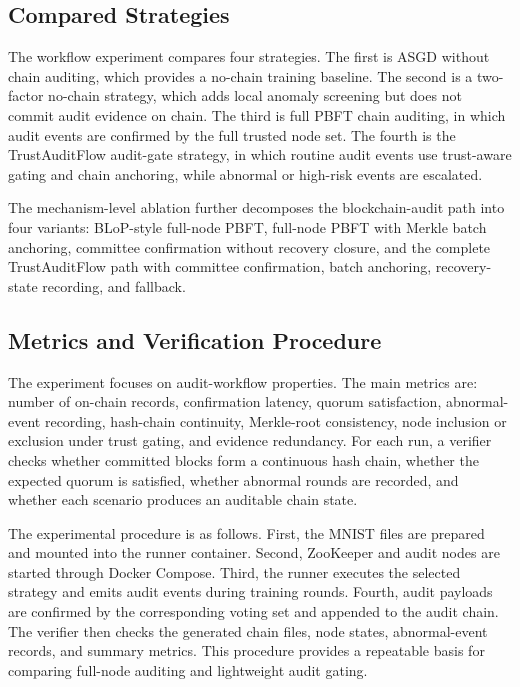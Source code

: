 \subsection{Compared Strategies}

The workflow experiment compares four strategies. The first is ASGD without chain auditing, which provides a no-chain training baseline. The second is a two-factor no-chain strategy, which adds local anomaly screening but does not commit audit evidence on chain. The third is full PBFT chain auditing, in which audit events are confirmed by the full trusted node set. The fourth is the TrustAuditFlow audit-gate strategy, in which routine audit events use trust-aware gating and chain anchoring, while abnormal or high-risk events are escalated.

The mechanism-level ablation further decomposes the blockchain-audit path into four variants: BLoP-style full-node PBFT, full-node PBFT with Merkle batch anchoring, committee confirmation without recovery closure, and the complete TrustAuditFlow path with committee confirmation, batch anchoring, recovery-state recording, and fallback.

\subsection{Metrics and Verification Procedure}

The experiment focuses on audit-workflow properties. The main metrics are: number of on-chain records, confirmation latency, quorum satisfaction, abnormal-event recording, hash-chain continuity, Merkle-root consistency, node inclusion or exclusion under trust gating, and evidence redundancy. For each run, a verifier checks whether committed blocks form a continuous hash chain, whether the expected quorum is satisfied, whether abnormal rounds are recorded, and whether each scenario produces an auditable chain state.

The experimental procedure is as follows. First, the MNIST files are prepared and mounted into the runner container. Second, ZooKeeper and audit nodes are started through Docker Compose. Third, the runner executes the selected strategy and emits audit events during training rounds. Fourth, audit payloads are confirmed by the corresponding voting set and appended to the audit chain. The verifier then checks the generated chain files, node states, abnormal-event records, and summary metrics. This procedure provides a repeatable basis for comparing full-node auditing and lightweight audit gating.
